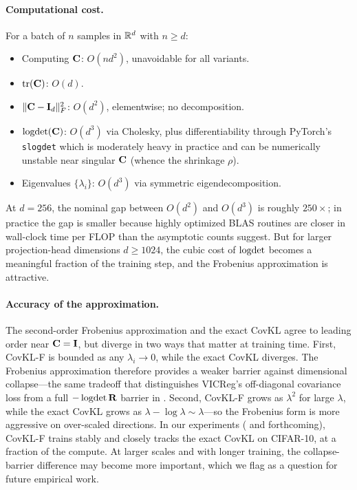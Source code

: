 \paragraph{Computational cost.}
For a batch of $n$ samples in $\mathbb{R}^d$ with $n \ge d$:
\begin{itemize}
    \item Computing $\mathbf{C}$: $O(n d^2)$, unavoidable for all variants.
    \item $\operatorname{tr}(\mathbf{C})$: $O(d)$.
    \item $\|\mathbf{C} - \mathbf{I}_d\|_F^2$: $O(d^2)$, elementwise; no decomposition.
    \item $\operatorname{logdet}(\mathbf{C})$: $O(d^3)$ via Cholesky, plus differentiability through PyTorch's \texttt{slogdet} which is moderately heavy in practice and can be numerically unstable near singular $\mathbf{C}$ (whence the shrinkage $\rho$).
    \item Eigenvalues $\{\lambda_i\}$: $O(d^3)$ via symmetric eigendecomposition.
\end{itemize}
At $d = 256$, the nominal gap between $O(d^2)$ and $O(d^3)$ is roughly $250\times$; in practice the gap is smaller because highly optimized BLAS routines are closer in wall-clock time per FLOP than the asymptotic counts suggest. But for larger projection-head dimensions $d \ge 1024$, the cubic cost of $\operatorname{logdet}$ becomes a meaningful fraction of the training step, and the Frobenius approximation is attractive.

\paragraph{Accuracy of the approximation.}
The second-order Frobenius approximation and the exact CovKL agree to leading order near $\mathbf{C} = \mathbf{I}$, but diverge in two ways that matter at training time. First, CovKL-F is bounded as any $\lambda_i \to 0$, while the exact CovKL diverges. The Frobenius approximation therefore provides a weaker barrier against dimensional collapse---the same tradeoff that distinguishes VICReg's off-diagonal covariance loss from a full $-\operatorname{logdet}\mathbf{R}$ barrier in . Second, CovKL-F grows as $\lambda^2$ for large $\lambda$, while the exact CovKL grows as $\lambda - \log\lambda \sim \lambda$---so the Frobenius form is more aggressive on over-scaled directions. In our experiments ( and forthcoming), CovKL-F trains stably and closely tracks the exact CovKL on CIFAR-10, at a fraction of the compute. At larger scales and with longer training, the collapse-barrier difference may become more important, which we flag as a question for future empirical work.

